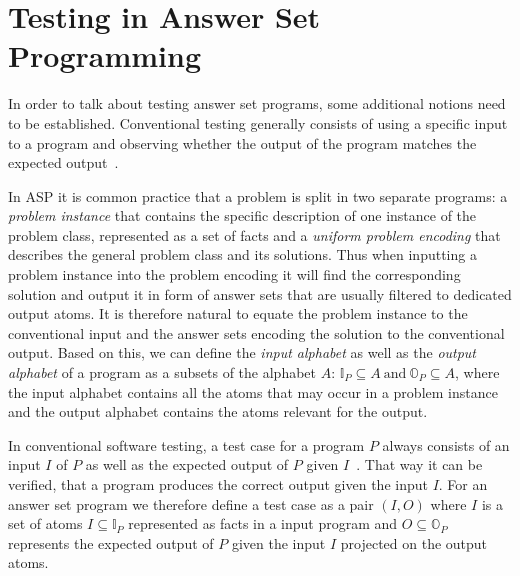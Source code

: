 \section{Testing in Answer Set Programming}
\label{sec:Preliminaries on answer set programming/Testing in Answer Set Programming}
In order to talk about testing answer set programs, some additional notions need to be established. Conventional testing generally consists of using a specific input to a program and observing whether the output of the program matches the expected output~\cite[71\psqq]{AO16}.

In ASP it is common practice that a problem is split in two separate programs: a \emph{problem instance} that contains the specific description of one instance of the problem class, represented as a set of facts and a \emph{uniform problem encoding} that describes the general problem class and its solutions. Thus when inputting a problem instance into the problem encoding it will find the corresponding solution and output it in form of answer sets that are usually filtered to dedicated output atoms. It is therefore natural to equate the problem instance to the conventional input and the answer sets encoding the solution to the conventional output. Based on this, we can define the \emph{input alphabet} as well as the \emph{output alphabet} of a program as a subsets of the alphabet $A$: \(\mathbb{I}_P \subseteq A\ \text{and}\ \mathbb{O}_P \subseteq A\), where the input alphabet contains all the atoms that may occur in a problem instance and the output alphabet contains the atoms relevant for the output.

In conventional software testing, a test case for a program $P$ always consists of an input $I$ of $P$ as well as the expected output of $P$ given $I$~\cite{ISO29119-1}. That way it can be verified, that a program produces the correct output given the input $I$. For an answer set program we therefore define a test case as a pair \((I, O)\) where $I$ is a set of atoms \(I \subseteq \mathbb{I}_P\) represented as facts in a input program and \(O \subseteq \mathbb{O}_P\) represents the expected output of $P$ given the input $I$ projected on the output atoms.

